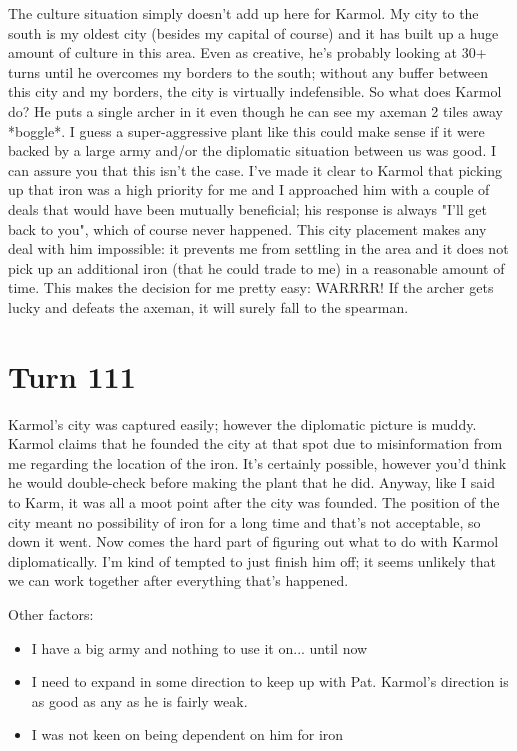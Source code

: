 \documentclass[10pt]{article}
\begin{document}
The culture situation simply doesn't add up here for Karmol. My city
to the south is my oldest city (besides my capital of course) and it
has built up a huge amount of culture in this area. Even as creative,
he's probably looking at 30+ turns until he overcomes my borders to
the south; without any buffer between this city and my borders, the
city is virtually indefensible. So what does Karmol do? He puts a
single archer in it even though he can see my axeman 2 tiles away
*boggle*. I guess a super-aggressive plant like this could make sense
if it were backed by a large army and/or the diplomatic situation
between us was good. I can assure you that this isn't the case. I've
made it clear to Karmol that picking up that iron was a high priority
for me and I approached him with a couple of deals that would have
been mutually beneficial; his response is always "I'll get back to
you", which of course never happened. This city placement makes any
deal with him impossible: it prevents me from settling in the area and
it does not pick up an additional iron (that he could trade to me) in
a reasonable amount of time. This makes the decision for me pretty
easy: WARRRR! If the archer gets lucky and defeats the axeman, it will
surely fall to the spearman.

\section*{Turn 111}

Karmol's city was captured easily; however the diplomatic picture is
muddy. Karmol claims that he founded the city at that spot due to
misinformation from me regarding the location of the iron. It's
certainly possible, however you'd think he would double-check before
making the plant that he did. Anyway, like I said to Karm, it was all
a moot point after the city was founded. The position of the city
meant no possibility of iron for a long time and that's not
acceptable, so down it went. Now comes the hard part of figuring out
what to do with Karmol diplomatically. I'm kind of tempted to just
finish him off; it seems unlikely that we can work together after
everything that's happened.

Other factors:
\begin{itemize}
\item I have a big army and nothing to use it on... until now
\item I need to expand in some direction to keep up with Pat. Karmol's direction is as good as any as he is fairly weak.
\item I was not keen on being dependent on him for iron
\end{itemize}
\end{document}

